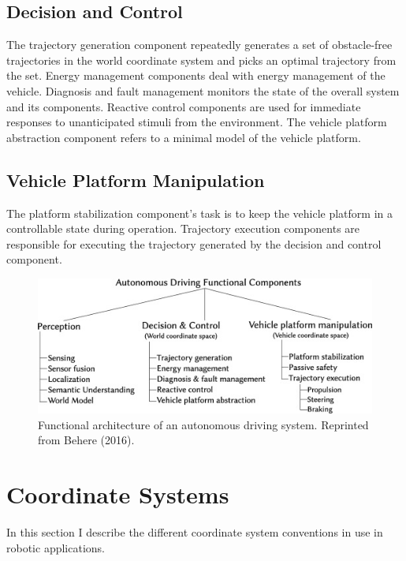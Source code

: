 \subsection{Decision and Control}
The trajectory generation component repeatedly generates a set of obstacle-free trajectories in the world coordinate system and picks an optimal trajectory from the set. Energy management components deal with energy management of the vehicle. Diagnosis and fault management monitors the state of the overall system and its components. Reactive control components are used for immediate responses to unanticipated stimuli from the environment. The vehicle platform abstraction component refers to a minimal model of the vehicle platform. 

\subsection{Vehicle Platform Manipulation}

The platform stabilization component's task is to keep the vehicle platform in a controllable state during operation. Trajectory execution components are responsible for executing the trajectory generated by the decision and control component. 

\begin{figure}
	\centering
	\includegraphics[width=5in]{figures/literature/fav_autonomous_driving}
	\caption[FAV of Antonomous Driving System.]{\small 
		Functional architecture of an autonomous driving system. Reprinted from Behere (2016). }
	\label{fig:fav_automonous}
\end{figure}

\section{Coordinate Systems}

In this section I describe the different coordinate system conventions in use in robotic applications. 
	
